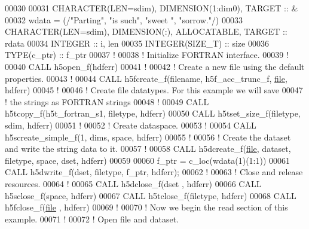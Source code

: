 \begin{DoxyCode}
00030 
00031   \textcolor{keywordtype}{CHARACTER(LEN=sdim)}, \textcolor{keywordtype}{DIMENSION(1:dim0)}, \textcolor{keywordtype}{TARGET} :: &
00032        wdata = (/\textcolor{stringliteral}{"Parting"}, \textcolor{stringliteral}{"is such"}, \textcolor{stringliteral}{"sweet  "}, \textcolor{stringliteral}{"sorrow."}/)
00033   \textcolor{keywordtype}{CHARACTER(LEN=sdim)}, \textcolor{keywordtype}{DIMENSION(:)}, \textcolor{keywordtype}{ALLOCATABLE}, \textcolor{keywordtype}{TARGET} :: rdata
00034   \textcolor{keywordtype}{INTEGER} :: i, len
00035   \textcolor{keywordtype}{INTEGER(SIZE\_T)} :: size
00036   \textcolor{keywordtype}{TYPE}(c\_ptr) :: f\_ptr
00037   \textcolor{comment}{!}
00038   \textcolor{comment}{! Initialize FORTRAN interface.}
00039   \textcolor{comment}{!}
00040   \textcolor{keyword}{CALL }h5open\_f(hdferr)
00041   \textcolor{comment}{!}
00042   \textcolor{comment}{! Create a new file using the default properties.}
00043   \textcolor{comment}{!}
00044   \textcolor{keyword}{CALL }h5fcreate\_f(filename, h5f\_acc\_trunc\_f, \hyperlink{structfile}{file}, hdferr)
00045   \textcolor{comment}{!}
00046   \textcolor{comment}{! Create file datatypes.  For this example we will save}
00047   \textcolor{comment}{! the strings as FORTRAN strings}
00048   \textcolor{comment}{!}
00049   \textcolor{keyword}{CALL }h5tcopy\_f(h5t\_fortran\_s1, filetype, hdferr)
00050   \textcolor{keyword}{CALL }h5tset\_size\_f(filetype, sdim, hdferr)
00051   \textcolor{comment}{!}
00052   \textcolor{comment}{! Create dataspace.}
00053   \textcolor{comment}{!}
00054   \textcolor{keyword}{CALL }h5screate\_simple\_f(1, dims, space, hdferr)
00055   \textcolor{comment}{!}
00056   \textcolor{comment}{! Create the dataset and write the string data to it.}
00057   \textcolor{comment}{!}
00058   \textcolor{keyword}{CALL }h5dcreate\_f(\hyperlink{structfile}{file}, dataset, filetype, space, dset, hdferr)
00059 
00060   f\_ptr = c\_loc(wdata(1)(1:1))
00061   \textcolor{keyword}{CALL }h5dwrite\_f(dset, filetype, f\_ptr, hdferr);
00062   \textcolor{comment}{!}
00063   \textcolor{comment}{! Close and release resources.}
00064   \textcolor{comment}{!}
00065   \textcolor{keyword}{CALL }h5dclose\_f(dset , hdferr)
00066   \textcolor{keyword}{CALL }h5sclose\_f(space, hdferr)
00067   \textcolor{keyword}{CALL }h5tclose\_f(filetype, hdferr)
00068   \textcolor{keyword}{CALL }h5fclose\_f(\hyperlink{structfile}{file} , hdferr)
00069   \textcolor{comment}{!}
00070   \textcolor{comment}{! Now we begin the read section of this example.}
00071   \textcolor{comment}{!}
00072   \textcolor{comment}{! Open file and dataset.}

\end{DoxyCode}
